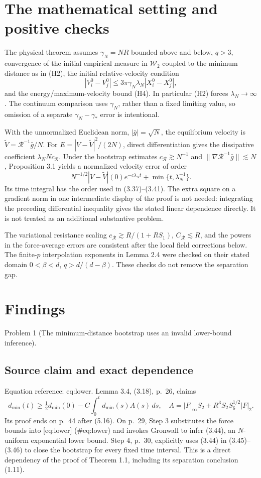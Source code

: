 \documentclass[10pt]{article}
\begin{document}
\section*{The mathematical setting and positive checks}
The physical theorem assumes \(\gamma_N=NR\) bounded above and below, \(q>3\), convergence of the initial empirical measure in \(\mathcal W_2\) coupled to the minimum distance as in (H2), the initial relative-velocity condition \[|V_i^0-V_j^0|\le 3\pi\gamma_N\lambda_N |X_i^0-X_j^0|,\] and the energy/maximum-velocity bound (H4). In particular (H2) forces \(\lambda_N\to\infty\). The continuum comparison uses \(\gamma_N\), rather than a fixed limiting value, so omission of a separate \(\gamma_N-\gamma_\ast\) error is intentional.\par
With the unnormalized Euclidean norm, \(|\bar g|=\sqrt N\), the equilibrium velocity is \(\widetilde V=\mathcal R^{-1}\bar g/N\). For \(E=|V-\widetilde V|^2/(2N)\), direct differentiation gives the dissipative coefficient \(\lambda_N N c_{\mathcal R}\). Under the bootstrap estimates \(c_{\mathcal R}\gtrsim N^{-1}\) and \(\|\nabla\mathcal R^{-1}\bar g\|\lesssim N\), Proposition 3.1 yields a normalized velocity error of order \[N^{-1/2}|V-\widetilde V|(0)e^{-c\lambda_Nt}
       +\min\{t,\lambda_N^{-1}\}.\] Its time integral has the order used in (3.37)–(3.41). The extra square on a gradient norm in one intermediate display of the proof is not needed: integrating the preceding differential inequality gives the stated linear dependence directly. It is not treated as an additional substantive problem.\par
The variational resistance scaling \(c_{\mathcal R}\gtrsim R/(1+RS_1)\), \(C_{\mathcal R}\lesssim R\), and the powers in the force-average errors are consistent after the local field corrections below. The finite-\(p\) interpolation exponents in Lemma 2.4 were checked on their stated domain \(0<\beta<d\), \(q>d/(d-\beta)\). These checks do not remove the separation gap.\par
\section*{Findings}
Problem 1 (The minimum-distance bootstrap uses an invalid lower-bound inference).\par
\subsection*{Source claim and exact dependence}
Equation reference: eq:lower. Lemma 3.4, (3.18), p. 26, claims \[
 d_{\min}(t)\ge \tfrac12d_{\min}(0)
 -C\int_0^t d_{\min}(s)A(s)\,ds,
 \quad A=|F|_\infty S_2+R^3S_2S_6^{1/2}|F|_2.\] Its proof ends on p. 44 after (5.16). On p. 29, Step 3 substitutes the force bounds into [eq:lower] (\#eq:lower) and invokes Gronwall to infer (3.44), an \(N\)-uniform exponential lower bound. Step 4, p. 30, explicitly uses (3.44) in (3.45)–(3.46) to close the bootstrap for every fixed time interval. This is a direct dependency of the proof of Theorem 1.1, including its separation conclusion (1.11).\par
\end{document}
